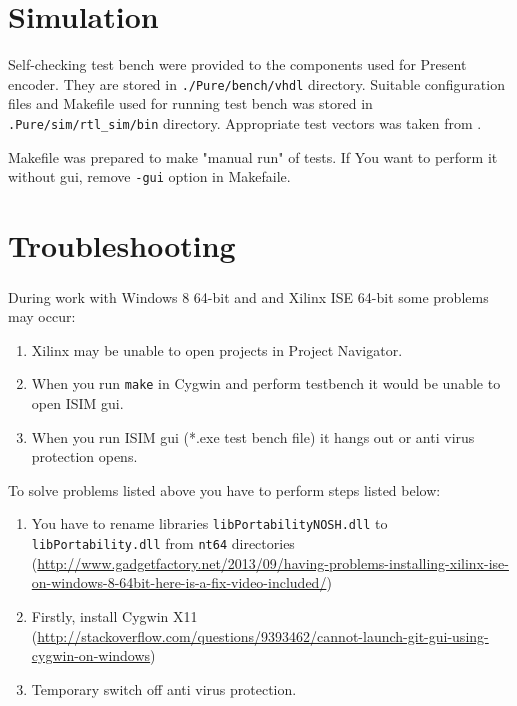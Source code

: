 \documentclass{gajewski}
\begin{document}


\newpage

\section{Simulation}

Self-checking test bench were provided to the components used for Present encoder. They are stored in \texttt{./Pure/bench/vhdl} directory. Suitable configuration files and Makefile used for running test bench was stored in 
\texttt{.Pure/sim/rtl\_sim/bin} directory. Appropriate test vectors was taken from \cite{PRESENT}.

Makefile was prepared to make "manual run" of tests. If You want to perform it without gui, remove \texttt{-gui} option in Makefaile.

\newpage

\section{Troubleshooting}

During work with Windows 8 64-bit and and Xilinx\textsuperscript{\textregistered} ISE 64-bit some problems may occur:

\begin{enumerate}
    \item Xilinx may be unable to open projects in Project Navigator.
    \item When you run \texttt{make} in Cygwin and perform testbench it would be unable to open ISIM gui.
    \item When you run ISIM gui  (*.exe test bench file) it hangs out or anti virus protection opens.
\end{enumerate}

To solve problems listed above you have to perform steps listed below:
\begin{enumerate}
    \item You have to rename libraries \texttt{libPortabilityNOSH.dll} to \texttt{libPortability.dll} from \texttt{nt64} directories (\href{http://www.gadgetfactory.net/2013/09/having-problems-installing-xilinx-ise-on-windows-8-64bit-here-is-a-fix-video-included/}{http://www.gadgetfactory.net/2013/09/having-problems-installing-xilinx-ise-on-windows-8-64bit-here-is-a-fix-video-included/})
    \item Firstly, install Cygwin X11 (\href{http://stackoverflow.com/questions/9393462/cannot-launch-git-gui-using-cygwin-on-windows}{http://stackoverflow.com/questions/9393462/cannot-launch-git-gui-using-cygwin-on-windows})
    \item Temporary switch off anti virus protection.
\end{enumerate}
\end{document}
